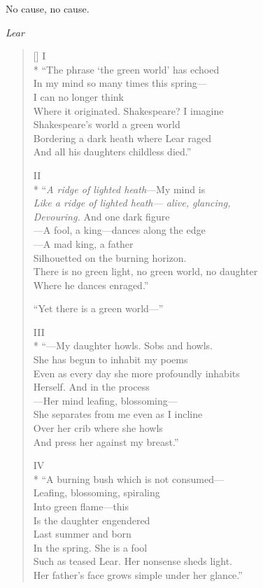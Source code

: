 \label{ch:amotherwatching}
\begingroup
\setlength{\epigraphwidth}{2.25cm}
\epigraph{No cause, no cause.}{\textit{Lear}}
\endgroup
\settowidth{\versewidth}{There is no green light, no green world, no daughter}
\begin{verse}[\versewidth]
I\\*
 ``The phrase `the green world' has echoed\\
In my mind so many times this spring---\\
I can no longer think\\
Where it originated.  Shakespeare?   I imagine \\
Shakespeare's world a green world\\
Bordering a dark heath where Lear raged\\
And all his daughters childless died.''

II\\*
``\textit{A ridge of lighted heath}---My mind is \\
\textit{Like a ridge of lighted heath--- alive, glancing,\\
Devouring.} And one dark figure\\
---A fool, a king---dances along the edge\\
---A mad king, a father\\
Silhouetted on the burning horizon.\\
There is no green light, no green world, no daughter\\
Where he dances enraged.''

``Yet there is a green world---''

III\\*
``---My daughter howls. Sobs and howls.\\
She has begun to inhabit my poems\\
Even as every day she more profoundly inhabits\\
Herself. And in the process\\
---Her mind leafing, blossoming---\\
She separates from me even as I incline\\
Over her crib where she howls\\
And press her against my breast.''

IV\\*
``A burning bush which is not consumed---\\
Leafing, blossoming, spiraling\\
Into green flame---this\\
Is the daughter engendered\\
Last summer and born\\
In the spring. She is a fool\\
Such as teased Lear. Her nonsense sheds light.\\
Her father's face grows simple under her glance.''


\end{verse}
